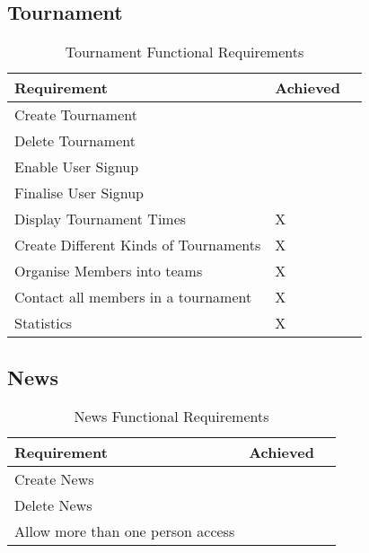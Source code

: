 \subsection{Tournament}
\begin{table}[H]
\begin{center}
    \begin{tabular}{| l | l | p{1cm} |}
    \hline
    Requirement & Achieved\\ \hline
	Create Tournament & \checkmark \\ \hline
	Delete Tournament & \checkmark \\ \hline
	Enable User Signup	& \checkmark \\ \hline
	Finalise User Signup	& \checkmark \\ \hline
	Display Tournament Times& X \\ \hline
	Create Different Kinds of Tournaments & X \\ \hline
	Organise Members into teams & X \\ \hline
	Contact all members in a tournament & X \\ \hline
	Statistics & X \\ \hline
	\end{tabular}
\end{center}
\caption{Tournament Functional Requirements}
\end{table}


\subsection{News}
\begin{table}[H]
\begin{center}
    \begin{tabular}{| l | l | p{1cm} |}
    \hline
    Requirement & Achieved\\ \hline
	Create News & \checkmark \\ \hline
	Delete News & \checkmark \\ \hline
	Allow more than one person access & \checkmark \\ \hline
	\end{tabular}
\end{center}
\caption{News Functional Requirements}
\end{table}


